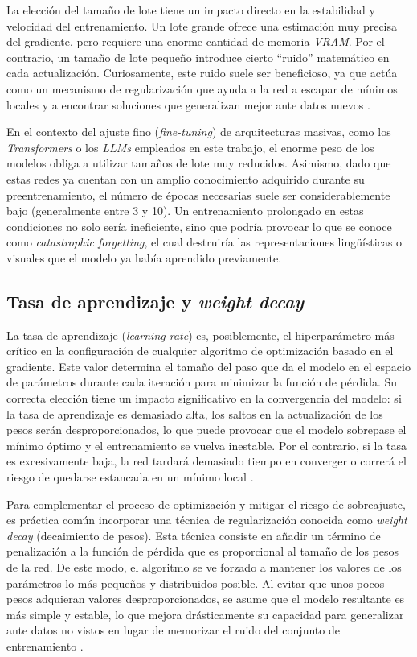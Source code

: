 La elección del tamaño de lote tiene un impacto directo en la estabilidad y velocidad del entrenamiento. Un lote grande ofrece una estimación muy precisa del gradiente, pero requiere una enorme cantidad de memoria \textit{VRAM}. Por el contrario, un tamaño de lote pequeño introduce cierto ``ruido'' matemático en cada actualización. Curiosamente, este ruido suele ser beneficioso, ya que actúa como un mecanismo de regularización que ayuda a la red a escapar de mínimos locales y a encontrar soluciones que generalizan mejor ante datos nuevos \cite{masters2018revisiting}. 

En el contexto del ajuste fino (\textit{fine-tuning}) de arquitecturas masivas, como los \textit{Transformers} o los \textit{LLMs} empleados en este trabajo, el enorme peso de los modelos obliga a utilizar tamaños de lote muy reducidos. Asimismo, dado que estas redes ya cuentan con un amplio conocimiento adquirido durante su preentrenamiento, el número de épocas necesarias suele ser considerablemente bajo (generalmente entre 3 y 10). Un entrenamiento prolongado en estas condiciones no solo sería ineficiente, sino que podría provocar lo que se conoce como \textit{catastrophic forgetting}, el cual destruiría las representaciones lingüísticas o visuales que el modelo ya había aprendido previamente. 

\subsection{Tasa de aprendizaje y \textit{weight decay}}
\label{subsec:LearningRate}
La tasa de aprendizaje (\textit{learning rate}) es, posiblemente, el hiperparámetro más crítico en la configuración de cualquier algoritmo de optimización basado en el gradiente. Este valor determina el tamaño del paso que da el modelo en el espacio de parámetros durante cada iteración para minimizar la función de pérdida. Su correcta elección tiene un impacto significativo en la convergencia del modelo: si la tasa de aprendizaje es demasiado alta, los saltos en la actualización de los pesos serán desproporcionados, lo que puede provocar que el modelo sobrepase el mínimo óptimo y el entrenamiento se vuelva inestable. Por el contrario, si la tasa es excesivamente baja, la red tardará demasiado tiempo en converger o correrá el riesgo de quedarse estancada en un mínimo local \cite{ruder2016overview}. 

Para complementar el proceso de optimización y mitigar el riesgo de sobreajuste, es práctica común incorporar una técnica de regularización conocida como \textit{weight decay} (decaimiento de pesos). Esta técnica consiste en añadir un término de penalización a la función de pérdida que es proporcional al tamaño de los pesos de la red. De este modo, el algoritmo se ve forzado a mantener los valores de los parámetros lo más pequeños y distribuidos posible. Al evitar que unos pocos pesos adquieran valores desproporcionados, se asume que el modelo resultante es más simple y estable, lo que mejora drásticamente su capacidad para generalizar ante datos no vistos en lugar de memorizar el ruido del conjunto de entrenamiento \cite{krogh1991simple}.

